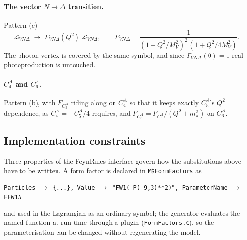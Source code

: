 \documentclass[11pt,a4paper]{article}
\newcommand{\code}[1]{\texttt{\small #1}}
\begin{document}
\paragraph{The vector $N\to\Delta$ transition.} Pattern (c):
\begin{equation}
  \mathcal{L}_{VN\Delta} \;\longrightarrow\;
  F_{VN\Delta}(Q^2)\;\mathcal{L}_{VN\Delta} ,
  \qquad
  F_{VN\Delta} = \frac{1}{(1+Q^2/M_V^2)^2\,(1+Q^2/4M_V^2)} .
\end{equation}
The photon vertex is covered by the same symbol, and since $F_{VN\Delta}(0)=1$
real photoproduction is untouched.

\paragraph{$C_4^A$ and $C_6^A$.} Pattern (b), with $F_{C_5^A}$ riding along on
$C_4^A$ so that it keeps exactly $C_5^A$'s $Q^2$ dependence, as
$C_4^A=-C_5^A/4$ requires, and $F_{C_6^A} = F_{C_5^A}/(Q^2+m_\pi^2)$ on $C_6^A$.

\subsection{Implementation constraints}

Three properties of the FeynRules interface govern how the substitutions above
have to be written. A form factor is declared in \code{M\$FormFactors} as
\begin{center}
\code{Particles $\to$ \{...\}, Value $\to$ "FW1(-P(-9,3)**2)",
      ParameterName $\to$ FFW1A}
\end{center}
and used in the Lagrangian as an ordinary symbol; the generator evaluates the
named function at run time through a plugin (\code{FormFactors.C}), so the
parameterisation can be changed without regenerating the model.
\end{document}
